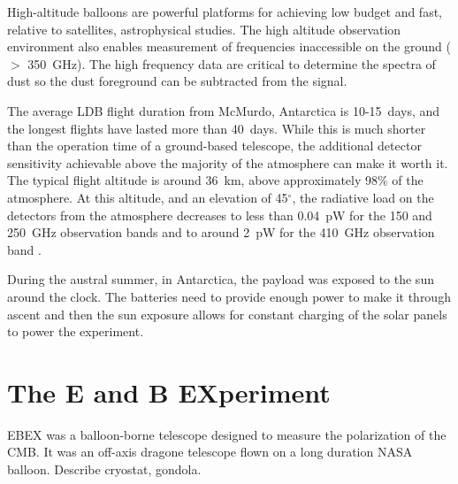 
High-altitude balloons are powerful platforms for achieving low budget and fast, relative to satellites, astrophysical studies. The high altitude observation environment also enables measurement of frequencies inaccessible on the ground ($>$ 350~GHz). The high frequency data are critical to determine the spectra of dust so the dust foreground can be subtracted from the signal. 

The average \ac{LDB} flight duration from McMurdo, Antarctica is 10-15~days, and the longest flights have lasted more than 40~days.  
While this is much shorter than the operation time of a ground-based telescope, the additional detector sensitivity achievable above the majority of the atmosphere can make it worth it. 
The typical flight altitude is around 36~km, above approximately 98\% of the atmosphere. 
At this altitude, and an elevation of 45$^\circ$, the radiative load on the detectors from the atmosphere decreases to less than 0.04~pW for the 150 and 250~GHz observation bands and to around 2~pW for the 410~GHz observation band \cite{Bao2015}. 

During the austral summer, in Antarctica, the payload was exposed to the sun around the clock. 
The batteries need to provide enough power to make it through ascent and then the sun exposure allows for constant charging of the solar panels to power the experiment. 






\section{The E and B EXperiment}
\label{sec:ebex}

\ac{EBEX} was a balloon-borne telescope designed to measure the polarization of the \ac{CMB}.
It was an off-axis dragone telescope flown on a long duration \ac{NASA} balloon. 
Describe cryostat, gondola. 

